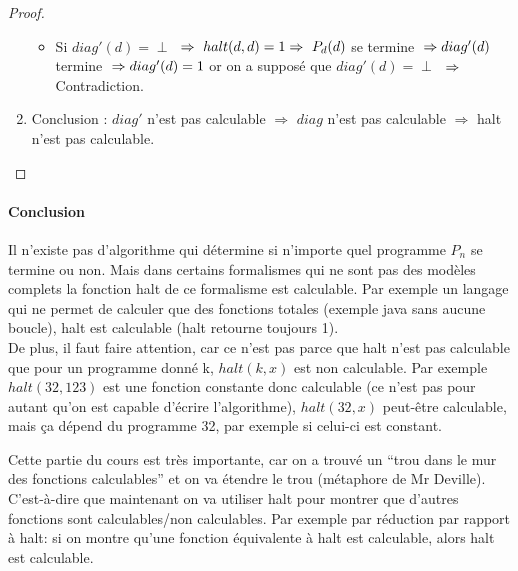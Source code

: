 \begin{mytheo}[halt]
\begin{proof}
\begin{enumerate}
\begin{itemize}
				\item Si $diag'(d)= \perp$ $\\
				\Rightarrow \  halt(d,d) = 1 \\
				\Rightarrow \ P_d(d)$ se termine $ \\
				\Rightarrow diag'(d)$ termine $ \\
				\Rightarrow diag'(d) = 1$ or on a supposé que $diag'(d) = \perp$ $ \\
				\Rightarrow $
				Contradiction.
			\end{itemize}
		\item Conclusion : $diag'$ n'est pas calculable $ \Rightarrow $ $diag$
		n'est pas calculable $ \Rightarrow $ halt n'est pas calculable.
	
	\end{enumerate}
	\end{proof}

\end{mytheo}

\paragraph{Conclusion} Il n'existe pas d'algorithme qui détermine si n'importe quel programme $P_n$ se termine ou non. Mais dans certains formalismes qui ne sont pas des modèles complets la fonction halt de ce formalisme est calculable.
Par exemple un langage qui ne permet de calculer
que des fonctions totales (exemple java sans aucune boucle), halt est calculable (halt retourne toujours 1). \\

De plus, il faut faire attention, car ce n'est pas parce que halt n'est pas calculable que pour un programme donné k, $halt(k,x)$ est non calculable. Par exemple $halt(32,123)$ est une fonction constante donc calculable (ce n'est pas pour autant qu'on est capable d'écrire l'algorithme), $halt(32,x)$ peut-être calculable, mais ça dépend du programme 32, par exemple si celui-ci est constant.

\begin{myrem}
	Cette partie du cours est très importante, car on a trouvé un ``trou dans le mur des fonctions calculables'' et on va étendre le trou (métaphore
	de Mr Deville). C'est-à-dire que maintenant on va utiliser halt pour montrer que d'autres fonctions sont calculables/non calculables. Par exemple	par réduction par rapport à halt: si on montre qu'une fonction équivalente à halt est calculable, alors halt est calculable.
\end{myrem}

